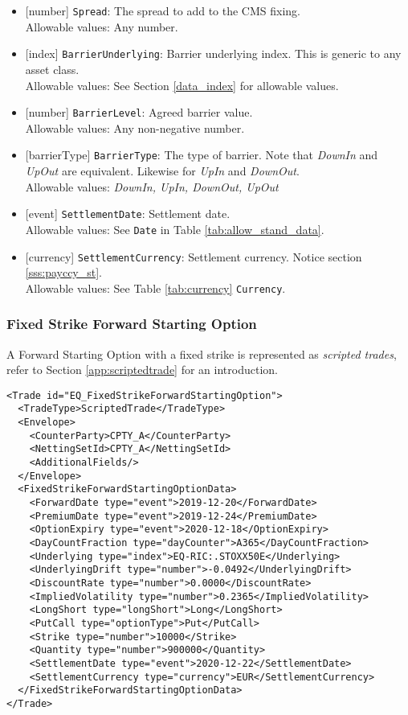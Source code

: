 \begin{itemize}
  \item{}[number] \lstinline!Spread!: The spread to add to the CMS fixing.\\
  Allowable values: Any number.
  \item{}[index] \lstinline!BarrierUnderlying!: Barrier underlying index. This is generic to any asset class. \\
  Allowable values: See Section \ref{data_index} for allowable values.
  \item{}[number] \lstinline!BarrierLevel!: Agreed barrier value. \\
  Allowable values: Any non-negative number.
  \item{}[barrierType] \lstinline!BarrierType!: The type of barrier. Note that \emph{DownIn} and
  \emph{UpOut} are equivalent. Likewise for \emph{UpIn} and \emph{DownOut}. \\
  Allowable values: \emph{DownIn, UpIn, DownOut, UpOut}
  \item{}[event] \lstinline!SettlementDate!: Settlement date. \\
  Allowable values: See \lstinline!Date! in Table \ref{tab:allow_stand_data}.
  \item{}[currency] \lstinline!SettlementCurrency!: Settlement currency. Notice section \ref{sss:payccy_st}. \\
  Allowable values: See Table \ref{tab:currency} \lstinline!Currency!.
\end{itemize}

\subsubsection{Fixed Strike Forward Starting Option}
 
 
A Forward Starting Option with a fixed strike is represented as {\em scripted trades}, refer to Section 
\ref{app:scriptedtrade} for an introduction.
 
\begin{verbatim} 
<Trade id="EQ_FixedStrikeForwardStartingOption">
  <TradeType>ScriptedTrade</TradeType>
  <Envelope>
    <CounterParty>CPTY_A</CounterParty>
    <NettingSetId>CPTY_A</NettingSetId>
    <AdditionalFields/>
  </Envelope>
  <FixedStrikeForwardStartingOptionData>
    <ForwardDate type="event">2019-12-20</ForwardDate>
    <PremiumDate type="event">2019-12-24</PremiumDate>
    <OptionExpiry type="event">2020-12-18</OptionExpiry>
    <DayCountFraction type="dayCounter">A365</DayCountFraction>
    <Underlying type="index">EQ-RIC:.STOXX50E</Underlying>
    <UnderlyingDrift type="number">-0.0492</UnderlyingDrift>
    <DiscountRate type="number">0.0000</DiscountRate>
    <ImpliedVolatility type="number">0.2365</ImpliedVolatility>
    <LongShort type="longShort">Long</LongShort>
    <PutCall type="optionType">Put</PutCall>
    <Strike type="number">10000</Strike>
    <Quantity type="number">900000</Quantity>
    <SettlementDate type="event">2020-12-22</SettlementDate>
    <SettlementCurrency type="currency">EUR</SettlementCurrency>
  </FixedStrikeForwardStartingOptionData>
</Trade>
\end{verbatim} 
 
